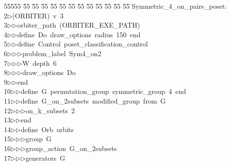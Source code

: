 %
%
\begin{tabbing}
55555 \= 55 \= 55 \= 55 \= 55 \= 55 \= 55 \= 55 \= 55 \= 55 \= 55 \= 55 \= 55 \= \>Symmetric\_4\_on\_pairs\_poset:\\[0pt]
2\>$\triangleright$\>(ORBITER)\ v\ 3\ \\[0pt]
3\>$\triangleright$\>$\triangleright$\>orbiter\_path\ (ORBITER\_EXE\_PATH)\ \\[0pt]
4\>$\triangleright$\>$\triangleright$\>define\ Do\ draw\_options\ radius\ 150\ end\ \\[0pt]
5\>$\triangleright$\>$\triangleright$\>define\ Control\ poset\_classification\_control\ \\[0pt]
6\>$\triangleright$\>$\triangleright$\>$\triangleright$\>problem\_label\ Sym4\_on2\ \\[0pt]
7\>$\triangleright$\>$\triangleright$\>$\triangleright$\>W\ depth\ 6\ \\[0pt]
8\>$\triangleright$\>$\triangleright$\>$\triangleright$\>draw\_options\ Do\ \\[0pt]
9\>$\triangleright$\>$\triangleright$\>end\ \\[0pt]
10\>$\triangleright$\>$\triangleright$\>define\ G\ permutation\_group\ symmetric\_group\ 4\ end\ \\[0pt]
11\>$\triangleright$\>$\triangleright$\>define\ G\_on\_2subsets\ modified\_group\ from\ G\ \\[0pt]
12\>$\triangleright$\>$\triangleright$\>$\triangleright$\>on\_k\_subsets\ 2\ \\[0pt]
13\>$\triangleright$\>$\triangleright$\>end\ \\[0pt]
14\>$\triangleright$\>$\triangleright$\>define\ Orb\ orbits\ \\[0pt]
15\>$\triangleright$\>$\triangleright$\>$\triangleright$\>group\ G\ \\[0pt]
16\>$\triangleright$\>$\triangleright$\>$\triangleright$\>group\_action\ G\_on\_2subsets\ \\[0pt]
17\>$\triangleright$\>$\triangleright$\>$\triangleright$\>generators\ G\ \\[0pt]

\end{tabbing}
